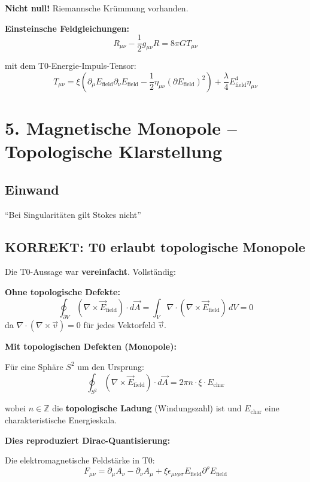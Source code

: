 	\textbf{Nicht null!} \checkmark Riemannsche Krümmung vorhanden.
	
	\textbf{Einsteinsche Feldgleichungen:}
	\[
	R_{\mu\nu} - \frac{1}{2} g_{\mu\nu} R = 8\pi G T_{\mu\nu}
	\]
	
	mit dem T0-Energie-Impuls-Tensor:
	\[
	T_{\mu\nu} = \xi (\partial_\mu E_{\text{field}} \partial_\nu E_{\text{field}} - \frac{1}{2} \eta_{\mu\nu} (\partial E_{\text{field}})^2) + \frac{\lambda}{4} E_{\text{field}}^4 \eta_{\mu\nu}
	\]
	
	\section*{5. Magnetische Monopole -- Topologische Klarstellung}
	
	\subsection*{Einwand}
	``Bei Singularitäten gilt Stokes nicht''
	
	\subsection*{\textbf{KORREKT: T0 erlaubt topologische Monopole}}
	
	Die T0-Aussage war \textbf{vereinfacht}. Vollständig:
	
	\textbf{Ohne topologische Defekte:}
	\[
	\oint_{\partial V} (\nabla \times \vec{E}_{\text{field}}) \cdot d\vec{A} = \int_V \nabla \cdot (\nabla \times \vec{E}_{\text{field}}) \, dV = 0
	\]
	da $\nabla \cdot (\nabla \times \vec{v}) = 0$ für jedes Vektorfeld $\vec{v}$.
	
	\textbf{Mit topologischen Defekten (Monopole):}
	
	Für eine Sphäre $S^2$ um den Ursprung:
	\[
	\oint_{S^2} (\nabla \times \vec{E}_{\text{field}}) \cdot d\vec{A} = 2\pi n \cdot \xi \cdot E_{\text{char}}
	\]
	
	wobei $n \in \mathbb{Z}$ die \textbf{topologische Ladung} (Windungszahl) ist und $E_{\text{char}}$ eine charakteristische Energieskala.
	
	\textbf{Dies reproduziert Dirac-Quantisierung:}
	
	Die elektromagnetische Feldstärke in T0:
	\[
	F_{\mu\nu} = \partial_\mu A_\nu - \partial_\nu A_\mu + \xi \epsilon_{\mu\nu\rho\sigma} E_{\text{field}} \partial^\rho E_{\text{field}}
	\]
	
